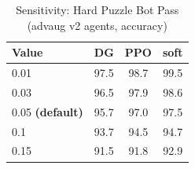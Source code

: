\begin{table}[h]
\centering
\caption{Sensitivity: Hard Puzzle Bot Pass (advaug v2 agents, accuracy)}
\label{tab:sensitivity_hard_puzzle_bot_pass}
\begin{tabular}{lccc}
\toprule
Value & DG & PPO & soft \\
\midrule
  0.01 & 97.5 & 98.7 & 99.5 \\
  0.03 & 96.5 & 97.9 & 98.6 \\
  0.05 \textbf{(default)} & 95.7 & 97.0 & 97.5 \\
  0.1 & 93.7 & 94.5 & 94.7 \\
  0.15 & 91.5 & 91.8 & 92.9 \\
\bottomrule
\end{tabular}
\end{table}